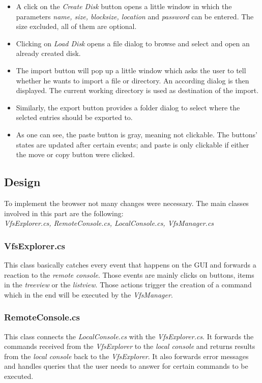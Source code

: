 \documentclass[a4paper,12pt]{article}
\begin{document}
\begin{itemize}
\item A click on the \emph{Create Disk} button opens a little window in which the parameters \emph{ name, size, blocksize, location} and \emph{password} can be entered. The size excluded, all of them are optional.
\item Clicking on \emph{Load Disk} opens a file dialog to browse and select and open an already created disk.
\item The import button will pop up a little window which asks the user to tell whether he wants to import a file or directory. An according dialog is then displayed. The current working directory is used as destination of the import.
\item Similarly, the export button provides a folder dialog to select where the selcted entries should be exported to.
\item As one can see, the paste button is gray, meaning not clickable. The buttons' states are updated after certain events; and paste is only clickable if either the move or copy button were clicked.
\end{itemize}


\subsection{Design}

To implement the browser not many changes were necessary. The main classes involved in this part are the following: \\
\emph{VfsExplorer.cs, RemoteConsole.cs, LocalConsole.cs, VfsManager.cs}
\subsubsection{VfsExplorer.cs}
This class basically catches every event that happens on the GUI and forwards a reaction to the \emph{remote console}. Those events are mainly clicks on buttons, items in the \emph{treeview} or the \emph{listview}. Those actions trigger the creation of a command which in the end will be executed by the \emph{VfsManager}.
\subsubsection{RemoteConsole.cs}
This class connects the \emph{LocalConsole.cs} with the \emph{VfsExplorer.cs}. It forwards the commands received from the \emph{VfsExplorer} to the \emph{local console} and returns results from the \emph{local console} back to the \emph{VfsExplorer}. It also forwards error messages and handles queries that the user needs to answer for certain commands to be executed.
\end{document}
